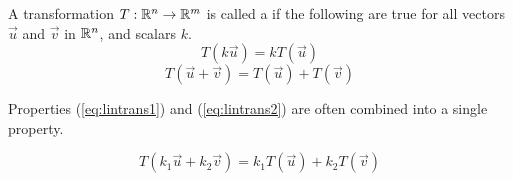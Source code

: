 \documentclass{ximera}
\begin{document}
  \begin{definition} \label{def:lin}
  
A transformation $T:\mathbb{R}^n\rightarrow \mathbb{R}^m$ is called a  if the following are true for all vectors $\vec{u}$ and $\vec{v}$ in $\mathbb{R}^n$, and scalars $k$.
\begin{equation}\label{eq:lintrans1}
T(k\vec{u})= kT(\vec{u})
\end{equation}
\begin{equation}\label{eq:lintrans2}
T(\vec{u}+\vec{v})= T(\vec{u})+T(\vec{v})
\end{equation}
  
\end{definition}


Properties (\ref{eq:lintrans1}) and (\ref{eq:lintrans2}) are often combined into a single property.


  
\begin{equation*}
T(k_1\vec{u}+k_2\vec{v})= k_1T(\vec{u})+k_2T(\vec{v})
\end{equation*}
  
\end{document}
